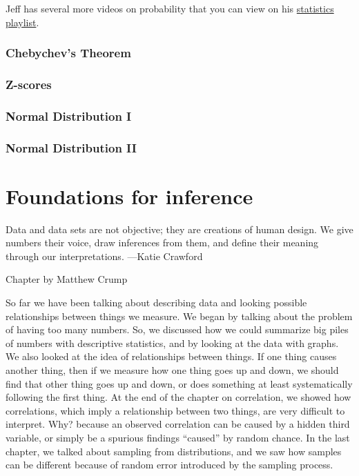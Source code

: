 \documentclass[
]{book}
\begin{document}
Jeff has several more videos on probability that you can view on his \href{https://www.youtube.com/playlist?list=PLKXdxQAT3tCvuex_E1ZnQYaw897ELUSaI}{statistics playlist}.

\subsection{Chebychev's Theorem}\label{chebychevs-theorem}

\subsection{Z-scores}\label{z-scores-1}

\subsection{Normal Distribution I}\label{normal-distribution-i}

\subsection{Normal Distribution II}\label{normal-distribution-ii}

\chapter{Foundations for inference}\label{foundations-for-inference}

{
Data and data sets are not objective; they are creations of human design. We give numbers their voice, draw inferences from them, and define their meaning through our interpretations.
---Katie Crawford
}

Chapter by Matthew Crump

So far we have been talking about describing data and looking possible relationships between things we measure. We began by talking about the problem of having too many numbers. So, we discussed how we could summarize big piles of numbers with descriptive statistics, and by looking at the data with graphs. We also looked at the idea of relationships between things. If one thing causes another thing, then if we measure how one thing goes up and down, we should find that other thing goes up and down, or does something at least systematically following the first thing. At the end of the chapter on correlation, we showed how correlations, which imply a relationship between two things, are very difficult to interpret. Why? because an observed correlation can be caused by a hidden third variable, or simply be a spurious findings ``caused'' by random chance. In the last chapter, we talked about sampling from distributions, and we saw how samples can be different because of random error introduced by the sampling process.
\end{document}
